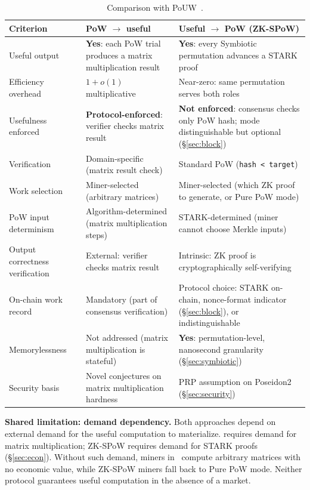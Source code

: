 \documentclass[11pt,a4paper]{article}
\begin{document}
\begin{table}[h]
\centering
\small
\begin{tabular}{@{}lp{}p{}@{}}
\toprule
Criterion & PoW $\to$ useful~\cite{komargodski2025} & Useful $\to$ PoW (ZK-SPoW) \\
\midrule
Useful output & \textbf{Yes}: each PoW trial produces a matrix multiplication result & \textbf{Yes}: every Symbiotic permutation advances a STARK proof \\
Efficiency overhead & $1+o(1)$ multiplicative & Near-zero: same permutation serves both roles \\
Usefulness enforced & \textbf{Protocol-enforced}: verifier checks matrix result & \textbf{Not enforced}: consensus checks only PoW hash; mode distinguishable but optional (\S\ref{sec:block}) \\
Verification & Domain-specific (matrix result check) & Standard PoW (\texttt{hash < target}) \\
Work selection & Miner-selected (arbitrary matrices) & Miner-selected (which ZK proof to generate, or Pure PoW mode) \\
PoW input determinism & Algorithm-determined (matrix multiplication steps) & STARK-determined (miner cannot choose Merkle inputs) \\
Output correctness verification & External: verifier checks matrix result & Intrinsic: ZK proof is cryptographically self-verifying \\
On-chain work record & Mandatory (part of consensus verification) & Protocol choice: STARK on-chain, nonce-format indicator (\S\ref{sec:block}), or indistinguishable \\
Memorylessness & Not addressed (matrix multiplication is stateful) & \textbf{Yes}: permutation-level, nanosecond granularity (\S\ref{sec:symbiotic}) \\
Security basis & Novel conjectures on matrix multiplication hardness & PRP assumption on Poseidon2 (\S\ref{sec:security}) \\
\bottomrule
\end{tabular}
\caption{Comparison with PoUW~\cite{komargodski2025}.}
\label{tab:pouw}
\end{table}

\textbf{Shared limitation: demand dependency.} Both approaches depend on external demand for the useful computation to materialize. \cite{komargodski2025} requires demand for matrix multiplication; ZK-SPoW requires demand for STARK proofs (\S\ref{sec:econ}). Without such demand, miners in~\cite{komargodski2025} compute arbitrary matrices with no economic value, while ZK-SPoW miners fall back to Pure PoW mode. Neither protocol guarantees useful computation in the absence of a market.
\end{document}
